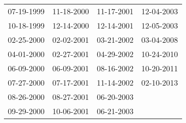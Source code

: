 \begin{supertabular}{llll}
 07-19-1999 &  11-18-2000 &  11-17-2001 &  12-04-2003 \\
 10-18-1999 &  12-14-2000 &  12-14-2001 &  12-05-2003 \\
 02-25-2000 &  02-02-2001 &  03-21-2002 &  03-04-2008 \\
 04-01-2000 &  02-27-2001 &  04-29-2002 &  10-24-2010 \\
 06-09-2000 &  06-09-2001 &  08-16-2002 &  10-20-2011 \\
 07-27-2000 &  07-17-2001 &  11-14-2002 &  02-10-2013 \\
 08-26-2000 &  08-27-2001 &  06-20-2003 &             \\
 09-29-2000 &  10-06-2001 &  06-21-2003 &             \\
\end{supertabular}
